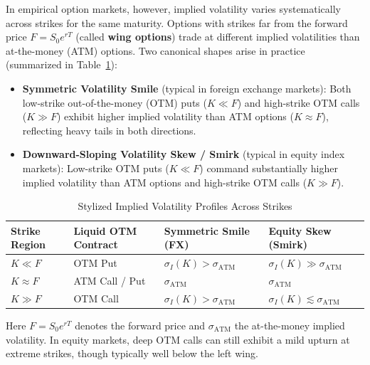 In empirical option markets, however, implied volatility varies systematically across strikes for the same maturity. Options with strikes far from the forward price $F = S_0 e^{rT}$ (called \textbf{wing options}) trade at different implied volatilities than at-the-money (ATM) options. Two canonical shapes arise in practice (summarized in Table~\ref{tab:ch05-smile}):
\begin{itemize}
    \item \textbf{Symmetric Volatility Smile} (typical in foreign exchange markets): Both low-strike out-of-the-money (OTM) puts ($K \ll F$) and high-strike OTM calls ($K \gg F$) exhibit higher implied volatility than ATM options ($K \approx F$), reflecting heavy tails in both directions.
    \item \textbf{Downward-Sloping Volatility Skew / Smirk} (typical in equity index markets): Low-strike OTM puts ($K \ll F$) command substantially higher implied volatility than ATM options and high-strike OTM calls ($K \gg F$).
\end{itemize}

\begin{table}[!ht]
    \centering
    \begin{threeparttable}
        \caption{Stylized Implied Volatility Profiles Across Strikes}
        \label{tab:ch05-smile}
        \begin{tabular}{llll}
            \toprule
            \textbf{Strike Region} & \textbf{Liquid OTM Contract} & \textbf{Symmetric Smile (FX)} & \textbf{Equity Skew (Smirk)} \\
            \midrule
            $K \ll F$ & OTM Put & $\sigma_I(K) > \sigma_{\text{ATM}}$ & $\sigma_I(K) \gg \sigma_{\text{ATM}}$ \\
            $K \approx F$ & ATM Call / Put & $\sigma_{\text{ATM}}$ & $\sigma_{\text{ATM}}$ \\
            $K \gg F$ & OTM Call & $\sigma_I(K) > \sigma_{\text{ATM}}$ & $\sigma_I(K) \lesssim \sigma_{\text{ATM}}$\tnote{a} \\
            \bottomrule
        \end{tabular}
        \begin{tablenotes}
            \item[a] \small{Here $F = S_0 e^{rT}$ denotes the forward price and $\sigma_{\text{ATM}}$ the at-the-money implied volatility. In equity markets, deep OTM calls can still exhibit a mild upturn at extreme strikes, though typically well below the left wing.}
        \end{tablenotes}
    \end{threeparttable}
\end{table}

